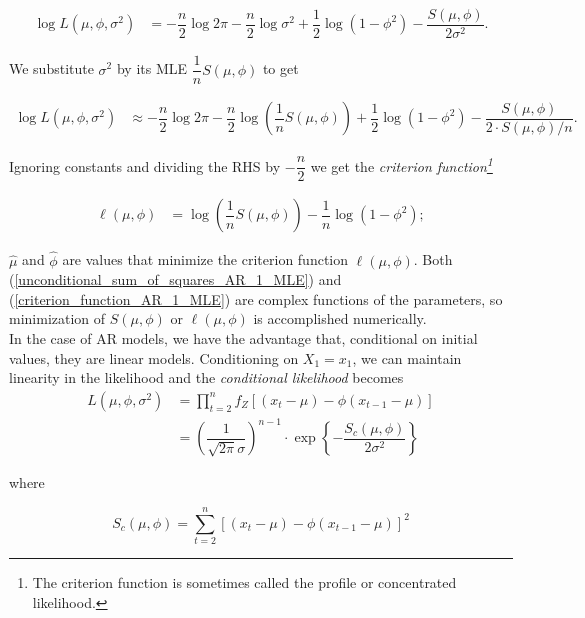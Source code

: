 \documentclass[11pt, a4paper]{article}
\numberwithin{equation}{section}
\theoremstyle{definition}
\begin{document}
\begin{align*}
\log L(\mu, \phi, \sigma^2) &= - \dfrac{n}{2} \log 2 \pi - \dfrac{n}{2} \log \sigma^2 + \dfrac{1}{2} \log \left( {1 - \phi^2} \right) - \dfrac{S(\mu, \phi)}{2 \sigma^2}.
\end{align*}

We substitute $\sigma^2$ by its MLE $\dfrac{1}{n} S(\mu, \phi)$ to get

\begin{align*}
\log L(\mu, \phi, \sigma^2) &\approx - \dfrac{n}{2} \log 2 \pi - \dfrac{n}{2} \log \left( \dfrac{1}{n} S(\mu, \phi) \right) + \dfrac{1}{2} \log \left( {1 - \phi^2} \right) - \dfrac{S(\mu, \phi)}{2 \cdot S(\mu, \phi) / n}.
\end{align*}

Ignoring constants and dividing the RHS by $-\dfrac{n}{2}$ we get the \textit{criterion function\footnote{The criterion function is sometimes called the profile or concentrated likelihood.}}

\begin{align} \label{criterion_function_AR_1_MLE}
\ell(\mu, \phi) &= \log \left( \dfrac{1}{n} S(\mu, \phi) \right) - \dfrac{1}{n} \log \left( {1 - \phi^2} \right);
\end{align}

$\hat{\mu}$ and $\hat{\phi}$ are values that minimize the criterion function $\ell (\mu, \phi)$. Both (\ref{unconditional_sum_of_squares_AR_1_MLE}) and (\ref{criterion_function_AR_1_MLE}) are complex functions of the parameters, so minimization of $S(\mu, \phi)$ or $\ell(\mu, \phi)$ is accomplished numerically. \\[0.1em]

In the case of AR models, we have the advantage that, conditional on initial values, they are linear models. Conditioning on $X_1 = x_1$, we can maintain linearity in the likelihood and the \textit{conditional likelihood} becomes
\begin{align}
L(\mu, \phi, \sigma^2) &= \prod \limits_{t = 2}^{n} f_Z\left[ (x_t - \mu) - \phi(x_{t-1} - \mu) \right] \nonumber \\[1em]
&= \left( \dfrac{1}{\sqrt{2 \pi} \sigma} \right)^{n-1} \cdot \exp \left\{ - \dfrac{S_c(\mu, \phi)}{2 \sigma^2} \right\}
\end{align}

where

\begin{equation}\label{conditional_sum_of_squares_AR_1}
S_c(\mu, \phi) = \sum \limits_{t = 2}^{n} \left[ (x_t - \mu) - \phi(x_{t-1} - \mu) \right]^2
\end{equation}
\end{document}
